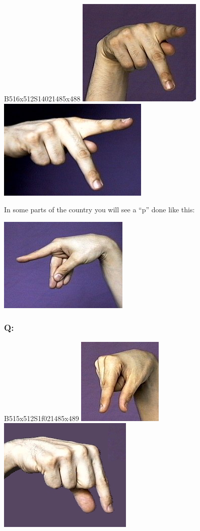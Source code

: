 \documentclass{article}
\begin{document}
B516x512S14021485x488
\includegraphics[scale=0.5]{images/p1.jpg}
\includegraphics[scale=0.5]{images/p2.jpg}

In some parts of the country you will see a ``p'' done like this:

\includegraphics[scale=0.5]{images/p3.jpg}

\subsubsection{Q:}

B515x512S1f021485x489
\includegraphics[scale=0.5]{images/q1.jpg}
\includegraphics[scale=0.5]{images/q2.jpg}
\end{document}
